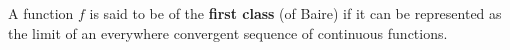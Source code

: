 A function $f$ is said to be of the \textbf{first class} (of Baire) if it can be represented as the limit of an everywhere convergent sequence of continuous functions.
